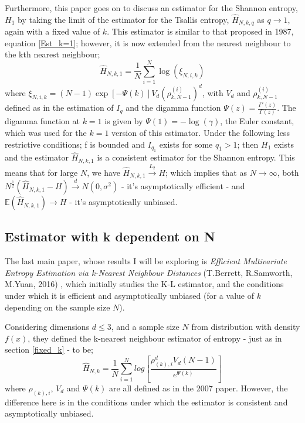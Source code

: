 \documentclass{report}
\begin{document}
Furthermore, this paper goes on to discuss an estimator for the Shannon entropy, $H_{1}$ by taking the limit of the estimator for the Tsallis entropy, $\hat{H}_{N, k, q}$ as $q \to 1$, again with a fixed value of $k$. This estimator is similar to that proposed in 1987, equation \ref{Est_k=1}; however, it is now extended from the nearest neighbour to the kth nearest neighbour;
\begin{equation}
\hat{H}_{N, k, 1} =  \frac{1}{N} \sum_{i=1}^{N} \log (\xi_{N, i, k})
\end{equation} 
where $\xi_{N, i, k} = (N-1)\exp[-\Psi(k)]V_{d}(\rho_{k, N-1}^{(i)})^{d}$, with $V_{d}$ and $\rho_{k, N-1}^{(i)}$ defined as in the estimation of $I_{q}$ and the digamma function $\Psi(z) = \frac{\Gamma'(z)}{\Gamma(z)}$. The digamma function at $k=1$ is given by $\Psi(1) = -\log(\gamma)$, the Euler constant, which was used for the $k=1$ version of this estimator. Under the following less restrictive conditions; f is bounded and $I_{q_{1}}$ exists for some $q_{1} > 1$; then $H_{1}$ exists and the estimator $\hat{H}_{N, k, 1}$ is a consistent estimator for the Shannon entropy. This means that for large $N$, we have $\hat{H}_{N, k, 1} \overset{L_{2}}{\to} H$; which implies that as $N \to \infty$, both $N^{\frac{1}{2}}(\hat{H}_{N, k, 1} - H) \overset{d}{\to} N(0, \sigma^2)$ - it's asymptotically efficient - and $\mathbb{E}(\hat{H}_{N, k, 1}) \to H$ - it's asymptotically unbiased.



\subsection{Estimator with k dependent on N} \label{dependent_k}

The last main paper, whose results I will be exploring is \textit{Efficient Multivariate Entropy Estimation via k-Nearest Neighbour Distances} (T.Berrett, R.Samworth, M.Yuan, 2016) \cite{paper4}, which initially studies the K-L estimator, and the conditions under which it is efficient and asymptotically unbiased (for a value of $k$ depending on the sample size $N$). 

Considering dimensions $d \leq 3$, and a sample size $N$ from distribution with density $f(x)$, they defined the k-nearest neighbour estimator of entropy - just as in section \ref{fixed_k} - to be;
\begin{equation}
\hat{H}_{N, k} = \frac{1}{N} \sum_{i=1}^{N} log \left[ \frac{\rho_{(k),i}^{d} V_{d} (N-1)}{e^{\Psi(k)}} \right]
\end{equation}
where $\rho_{(k),i}$, $V_{d}$ and $\Psi(k)$ are all defined as in the 2007 paper. However, the difference here is in the conditions under which the estimator is consistent and asymptotically unbiased.
\end{document}
